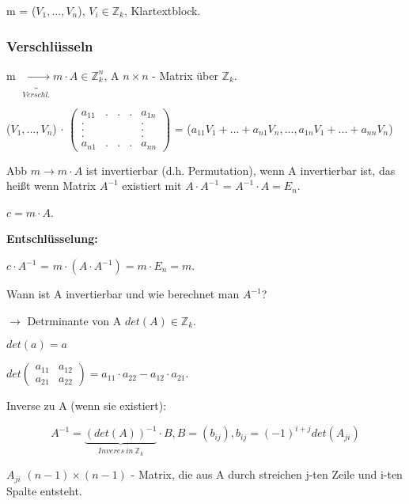 m = ($V_1,...,V_n$), $V_i \in \mathbb{Z}_k$, Klartextblock.

\subsubsection{Verschlüsseln}

m $\underbrace{\rightarrow}_{Verschl.} m \cdot A \in \mathbb{Z}_{k}^{n}$, A $n \times n$ - Matrix über $\mathbb{Z}_k$.

($V_1, ..., V_n$) $\cdot$ $\begin{pmatrix}a_{11} & . & . & . & a_{1n} \\ . &  &  &  & . \\ . & & & & . \\ . & & & & . \\ a_{n1} & . & . & . & a_{nn} \end{pmatrix}$ = ($a_{11}V_1 + ...+a_{n1}V_n, ..., a_{1n}V_1 + ... + a_{nn}V_n$) 

Abb $m \rightarrow m \cdot A$ ist invertierbar (d.h. Permutation), wenn A invertierbar ist, das heißt wenn Matrix $A^{-1}$ existiert mit $A \cdot A^{-1}$ = $A^{-1} \cdot A = E_n$.

$c = m \cdot A$.

\newpage

\textbf{Entschlüsselung:}

$c \cdot A^{-1}$ = $m \cdot (A \cdot A^{-1}) = m \cdot E_n = m$.

\par \medskip

Wann ist A invertierbar und wie berechnet man $A^{-1}$?

$\rightarrow$ Detrminante von A $det(A) \in \mathbb{Z}_k$.

$det(a) = a$

$det\begin{pmatrix}a_{11} & a_{12} \\ a_{21} & a_{22}\end{pmatrix} = a_{11} \cdot a_{22} - a_{12} \cdot a_{21}$.

\par \medskip

Inverse zu A (wenn sie existiert):

\begin{equation}
  A^{-1} = \underbrace{(det(A))^{-1}}_{Inveres \ in \ \mathbb{Z}_k} \cdot B, B = (b_{ij}), b_{ij} = (-1)^{i+j} det(A_{ji})
\end{equation}

$A_{ji}$ $(n-1) \times (n-1)$ - Matrix, die aus A durch streichen j-ten Zeile und i-ten Spalte entsteht.

